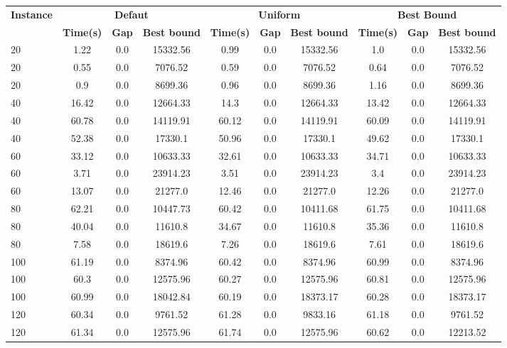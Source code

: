 \begin{table}[!h]
\centering
\hspace*{-1cm}\begin{tabular}{lccccccccc}
\toprule
\textbf{Instance}  & \multicolumn{3}{c}{\textbf{Defaut}} & \multicolumn{3}{c}{\textbf{Uniform}}  & \multicolumn{3}{c}{\textbf{Best Bound}}
\\
\cmidrule(r){2-4} \cmidrule(r){5-7} \cmidrule(r){8-10}
 & \textbf{Time(s)} & \textbf{Gap} & \textbf{Best bound} & \textbf{Time(s)} & \textbf{Gap} & \textbf{Best bound} & \textbf{Time(s)} & \textbf{Gap} & \textbf{Best bound}  \\
\midrule
20 & 1.22 & 0.0 & 15332.56 & 0.99 & 0.0 & 15332.56 & 1.0 & 0.0 & 15332.56 \\
20 & 0.55 & 0.0 & 7076.52 & 0.59 & 0.0 & 7076.52 & 0.64 & 0.0 & 7076.52 \\
20 & 0.9 & 0.0 & 8699.36 & 0.96 & 0.0 & 8699.36 & 1.16 & 0.0 & 8699.36 \\
40 & 16.42 & 0.0 & 12664.33 & 14.3 & 0.0 & 12664.33 & 13.42 & 0.0 & 12664.33 \\
40 & 60.78 & 0.0 & 14119.91 & 60.12 & 0.0 & 14119.91 & 60.09 & 0.0 & 14119.91 \\
40 & 52.38 & 0.0 & 17330.1 & 50.96 & 0.0 & 17330.1 & 49.62 & 0.0 & 17330.1 \\
60 & 33.12 & 0.0 & 10633.33 & 32.61 & 0.0 & 10633.33 & 34.71 & 0.0 & 10633.33 \\
60 & 3.71 & 0.0 & 23914.23 & 3.51 & 0.0 & 23914.23 & 3.4 & 0.0 & 23914.23 \\
60 & 13.07 & 0.0 & 21277.0 & 12.46 & 0.0 & 21277.0 & 12.26 & 0.0 & 21277.0 \\
80 & 62.21 & 0.0 & 10447.73 & 60.42 & 0.0 & 10411.68 & 61.75 & 0.0 & 10411.68 \\
80 & 40.04 & 0.0 & 11610.8 & 34.67 & 0.0 & 11610.8 & 35.36 & 0.0 & 11610.8 \\
80 & 7.58 & 0.0 & 18619.6 & 7.26 & 0.0 & 18619.6 & 7.61 & 0.0 & 18619.6 \\
100 & 61.19 & 0.0 & 8374.96 & 60.42 & 0.0 & 8374.96 & 60.99 & 0.0 & 8374.96 \\
100 & 60.3 & 0.0 & 12575.96 & 60.27 & 0.0 & 12575.96 & 60.81 & 0.0 & 12575.96 \\
100 & 60.99 & 0.0 & 18042.84 & 60.19 & 0.0 & 18373.17 & 60.28 & 0.0 & 18373.17 \\
120 & 60.34 & 0.0 & 9761.52 & 61.28 & 0.0 & 9833.16 & 61.18 & 0.0 & 9761.52 \\
120 & 61.34 & 0.0 & 12575.96 & 61.74 & 0.0 & 12575.96 & 60.62 & 0.0 & 12213.52 \\

\end{tabular}
\end{table}
